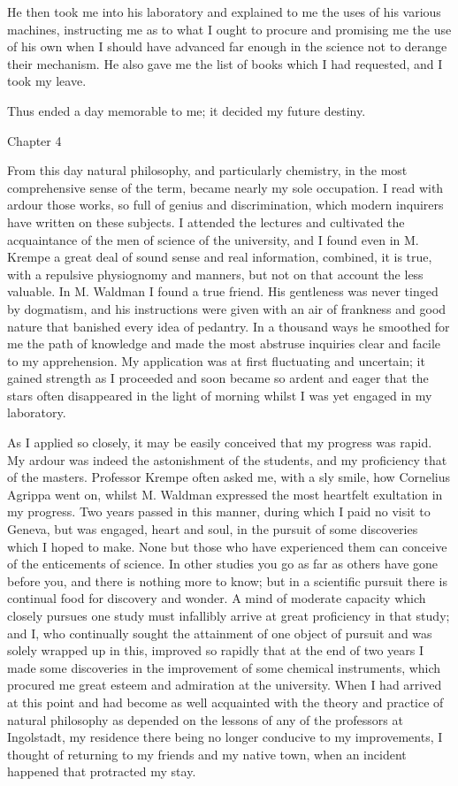\documentclass[12pt,openright]{book}
\begin{document}
He then took me into his laboratory and explained to me the uses of his various machines, instructing me as to what I ought to procure and promising me the use of his own when I should have advanced far enough in the science not to derange their mechanism. He also gave me the list of books which I had requested, and I took my leave.

Thus ended a day memorable to me; it decided my future destiny.

Chapter 4

From this day natural philosophy, and particularly chemistry, in the most comprehensive sense of the term, became nearly my sole occupation. I read with ardour those works, so full of genius and discrimination, which modern inquirers have written on these subjects. I attended the lectures and cultivated the acquaintance of the men of science of the university, and I found even in M. Krempe a great deal of sound sense and real information, combined, it is true, with a repulsive physiognomy and manners, but not on that account the less valuable. In M. Waldman I found a true friend. His gentleness was never tinged by dogmatism, and his instructions were given with an air of frankness and good nature that banished every idea of pedantry. In a thousand ways he smoothed for me the path of knowledge and made the most abstruse inquiries clear and facile to my apprehension. My application was at first fluctuating and uncertain; it gained strength as I proceeded and soon became so ardent and eager that the stars often disappeared in the light of morning whilst I was yet engaged in my laboratory.

As I applied so closely, it may be easily conceived that my progress was rapid. My ardour was indeed the astonishment of the students, and my proficiency that of the masters. Professor Krempe often asked me, with a sly smile, how Cornelius Agrippa went on, whilst M. Waldman expressed the most heartfelt exultation in my progress. Two years passed in this manner, during which I paid no visit to Geneva, but was engaged, heart and soul, in the pursuit of some discoveries which I hoped to make. None but those who have experienced them can conceive of the enticements of science. In other studies you go as far as others have gone before you, and there is nothing more to know; but in a scientific pursuit there is continual food for discovery and wonder. A mind of moderate capacity which closely pursues one study must infallibly arrive at great proficiency in that study; and I, who continually sought the attainment of one object of pursuit and was solely wrapped up in this, improved so rapidly that at the end of two years I made some discoveries in the improvement of some chemical instruments, which procured me great esteem and admiration at the university. When I had arrived at this point and had become as well acquainted with the theory and practice of natural philosophy as depended on the lessons of any of the professors at Ingolstadt, my residence there being no longer conducive to my improvements, I thought of returning to my friends and my native town, when an incident happened that protracted my stay.
\end{document}

